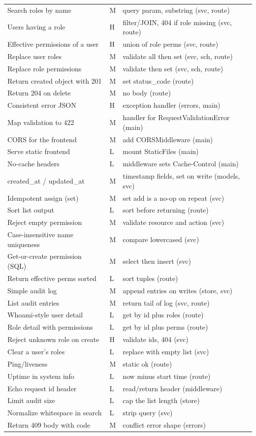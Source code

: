 \documentclass[11pt,a4paper]{report}
\begin{document}
\begin{longtable}{p{} p{} p{}}
Search roles by name & M & query param, substring (svc, route) \\
Users having a role & H & filter/JOIN, 404 if role missing (svc, route) \\
Effective permissions of a user & H & union of role perms (svc, route) \\
Replace user roles & M & validate all then set (svc, sch, route) \\
Replace role permissions & M & validate then set (svc, sch, route) \\
Return created object with 201 & M & set status\_code (route) \\
Return 204 on delete & M & no body (route) \\
Consistent error JSON & H & exception handler (errors, main) \\
Map validation to 422 & M & handler for RequestValidationError (main) \\
CORS for the frontend & M & add CORSMiddleware (main) \\
Serve static frontend & L & mount StaticFiles (main) \\
No-cache headers & L & middleware sets Cache-Control (main) \\
created\_at / updated\_at & M & timestamp fields, set on write (models, svc) \\
Idempotent assign (set) & M & set add is a no-op on repeat (svc) \\
Sort list output & L & sort before returning (route) \\
Reject empty permission & M & validate resource and action (svc) \\
Case-insensitive name uniqueness & M & compare lowercased (svc) \\
Get-or-create permission (SQL) & M & select then insert (svc) \\
Return effective perms sorted & L & sort tuples (route) \\
Simple audit log & M & append entries on writes (store, svc) \\
List audit entries & M & return tail of log (svc, route) \\
Whoami-style user detail & L & get by id plus roles (route) \\
Role detail with permissions & L & get by id plus perms (route) \\
Reject unknown role on create & H & validate ids, 404 (svc) \\
Clear a user's roles & L & replace with empty list (svc) \\
Ping/liveness & M & static ok (route) \\
Uptime in system info & L & now minus start time (route) \\
Echo request id header & L & read/return header (middleware) \\
Limit audit size & L & cap the list length (store) \\
Normalize whitespace in search & L & strip query (svc) \\
Return 409 body with code & M & conflict error shape (errors) \\
\end{longtable}
\end{document}
